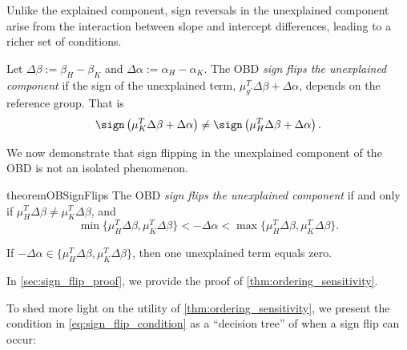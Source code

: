 Unlike the explained component, sign reversals in the unexplained component arise from the interaction between slope and intercept differences, leading to a richer set of conditions.

\begin{definition}
	Let $\Delta\beta := \beta_H - \beta_K$ and $\Delta\alpha := \alpha_H - \alpha_K$. The OBD \emph{sign flips the unexplained component} if the sign of the unexplained term, $\mu_{g'}^T \Delta\beta + \Delta\alpha$, depends on the reference group. That is
	\begin{equation}
		\sign\left( \mu_K^T \Delta\beta + \Delta\alpha \right) \neq \sign\left( \mu_H^T \Delta\beta + \Delta\alpha \right).
	\end{equation}
\end{definition}
%
We now demonstrate that sign flipping in the unexplained component of the OBD is not an isolated phenomenon.

\begin{restatable}{theorem}{OBSignFlips}
    \label{thm:ordering_sensitivity}
    The OBD \emph{sign flips the unexplained component} if and only if $\mu_H^T \Delta\beta \neq \mu_K^T \Delta\beta$, and
    \begin{equation}
    \label{eq:sign_flip_condition}
    \min\{\mu_H^T \Delta\beta, \mu_K^T \Delta\beta\} < -\Delta\alpha < \max\{\mu_H^T \Delta\beta, \mu_K^T \Delta\beta\}.
    \end{equation}
\end{restatable}    

\begin{remark}
    If $-\Delta\alpha \in \{\mu_H^T \Delta\beta, \mu_K^T \Delta\beta\}$, then one unexplained term equals zero.
\end{remark}

In \cref{sec:sign_flip_proof}, we provide the proof of \cref{thm:ordering_sensitivity}. 

To shed more light on the utility of \cref{thm:ordering_sensitivity}, we present the condition in \cref{eq:sign_flip_condition} as a ``decision tree'' of when a sign flip can occur: 

